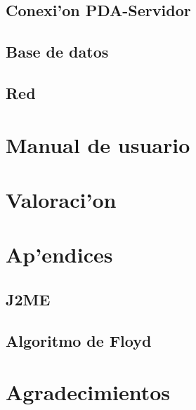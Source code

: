 \documentclass[a4paper,12pt]{article}
\begin{document}
	\subsection{Conexi'on PDA-Servidor}
		

	\subsection{Base de datos}
		

	\subsection{Red}


\pagebreak

\section{Manual de usuario}
		

\pagebreak

\section{Valoraci'on}

\pagebreak

\section{Ap'endices}

	\subsection{J2ME}
		

	\index \subsection{Algoritmo de Floyd}
		

\pagebreak

\section{Agradecimientos}
	

\pagebreak	

\printindex
\end{document}
